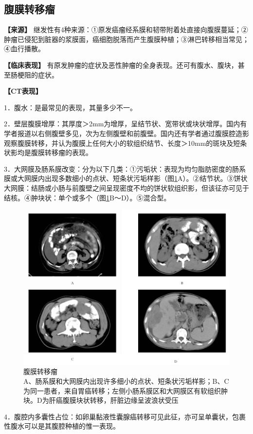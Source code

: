 \subsection{腹膜转移瘤}

\textbf{【来源】}
继发性有4种来源：①原发癌瘤经系膜和韧带附着处直接向腹膜蔓延；②肿瘤已侵犯到脏器的浆膜面，癌细胞脱落而产生腹膜种植；③淋巴转移相当常见；④血行播散。

\textbf{【临床表现】}
有原发肿瘤的症状及恶性肿瘤的全身表现。还可有腹水、腹块，甚至肠梗阻的症状。

\textbf{【CT表现】}

1．腹水：是最常见的表现，其量多少不一。

2．壁层腹膜增厚：其厚度＞2mm为增厚，呈结节状、宽带状或块状增厚。国内有学者报道以右侧腹壁多见，次为左侧腹壁和前腹壁。国内还有学者通过腹膜腔造影观察腹膜转移，并认为腹膜上任何大小的软组织结节、长度＞10mm的斑块及短条状影均是腹膜转移瘤的表现。

3．大网膜及肠系膜改变：分为以下几类：①污垢状：表现为均匀脂肪密度的肠系膜或大网膜内出现多数细小的点状、短条状污垢样影（图\ref{fig18-7}A）。②结节状。③饼状大网膜：结肠或小肠与前腹壁之间呈现密度不均的饼状软组织影，但该征亦可见于结核。④肿块状：单个或多个（图\ref{fig18-7}B～D）。⑤混合型。

\begin{figure}[!htbp]
 \centering
 \includegraphics[width=.7\textwidth,height=\textheight,keepaspectratio]{./images/Image00377.jpg}
 \captionsetup{justification=centering}
 \caption{腹膜转移瘤\\{\small A、肠系膜和大网膜内出现许多细小的点状、短条状污垢样影；B、C为同一患者，来自胃癌转移；左侧小肠系膜区和大网膜区有软组织肿块。D为肝癌腹膜块状转移，肝脏边缘呈波浪状受压}}
 \label{fig18-7}
  \end{figure} 

4．腹腔内多囊性占位：如卵巢黏液性囊腺癌转移可见此征，亦可呈单囊状，包裹性腹水可以是其腹腔种植的惟一表现。

